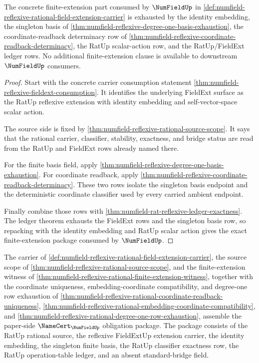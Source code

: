 \begin{theorem}
\label{thm:numfield-reflexive-finite-extension-exactness-package}
The concrete finite-extension part consumed by $\NumFieldUp$ in
\autoref{def:numfield-reflexive-rational-field-extension-carrier} is exhausted
by the identity embedding, the singleton basis of
\autoref{thm:numfield-reflexive-degree-one-basis-exhaustion}, the
coordinate-readback determinacy row of
\autoref{thm:numfield-reflexive-coordinate-readback-determinacy}, the RatUp
scalar-action row, and the RatUp/FieldExt ledger rows. No additional
finite-extension clause is available to downstream $\NumFieldUp$ consumers.
\end{theorem}
\begin{proof}
Start with the concrete carrier consumption statement
\autoref{thm:numfield-reflexive-fieldext-consumption}. It identifies the
underlying FieldExt surface as the RatUp reflexive extension with identity
embedding and self-vector-space scalar action.

The source side is fixed by
\autoref{thm:numfield-reflexive-rational-source-scope}. It says that the
rational carrier, classifier, stability, exactness, and bridge status are read
from the RatUp and FieldExt rows already named there.

For the finite basis field, apply
\autoref{thm:numfield-reflexive-degree-one-basis-exhaustion}. For coordinate
readback, apply
\autoref{thm:numfield-reflexive-coordinate-readback-determinacy}. These two
rows isolate the singleton basis endpoint and the deterministic coordinate
classifier used by every carried ambient endpoint.

Finally combine those rows with
\autoref{thm:numfield-rat-reflexive-ledger-exactness}. The ledger theorem
exhausts the FieldExt rows and the singleton basis row, so repacking with the
identity embedding and RatUp scalar action gives the exact finite-extension
package consumed by $\NumFieldUp$.
\end{proof}
\begin{theorem}
\label{thm:numfield-reflexive-rational-namecert-obligation-package}
The carrier of
\autoref{def:numfield-reflexive-rational-field-extension-carrier}, the source
scope of \autoref{thm:numfield-reflexive-rational-source-scope}, and the
finite-extension witness of
\autoref{thm:numfield-reflexive-rational-finite-extension-witness}, together
with the coordinate uniqueness, embedding-coordinate compatibility, and
degree-one row exhaustion of
\autoref{thm:numfield-reflexive-rational-coordinate-readback-uniqueness},
\autoref{thm:numfield-reflexive-rational-embedding-coordinate-compatibility},
and \autoref{thm:numfield-reflexive-rational-degree-one-row-exhaustion},
assemble the paper-side $\NameCert_{\NumFieldUp}$ obligation package. The
package consists of the RatUp rational source, the reflexive FieldExtUp
extension carrier, the identity embedding, the singleton finite basis, the
RatUp classifier exactness row, the RatUp operation-table ledger, and an
absent standard-bridge field.
\end{theorem}
